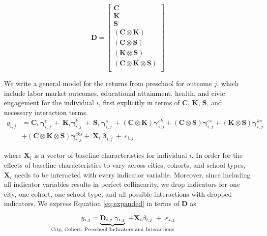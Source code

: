 \documentclass[11pt]{article}
\begin{document}
\begin{equation*}
\mathbf{D} =\begin{bmatrix} 
\mathbf{C} \\
\mathbf{K} \\
\mathbf{S} \\
(\mathbf{C} \otimes \mathbf{K}) \\
(\mathbf{C} \otimes \mathbf{S}) \\
(\mathbf{K} \otimes \mathbf{S}) \\
(\mathbf{C} \otimes \mathbf{K} \otimes \mathbf{S}) \\
\end{bmatrix}
\end{equation*}


We write a general model for the returns from preschool for outcome $j$, which include labor market outcomes, educational attainment, health, and civic engagement for the individual $i$, first explicitly in terms of $\mathbf{C}$, $\mathbf{K}$, $\mathbf{S}$, and necessary interaction terms. 
\begin{eqnarray} \label{eq:expanded}
y_{i,j} & = \mathbf{C}_{i} \ \mathbf{\gamma}_{i,j}^c\ +\ \mathbf{K}_{i} \mathbf{\gamma}^k_{i,j} \ +\ \mathbf{S}_{i}\  \mathbf{\gamma}^{s}_{i,j} \ +  (\mathbf{C} \otimes \mathbf{K})\mathbf{\gamma}_{i,j}^{ck} +   (\mathbf{C} \otimes \mathbf{S})\mathbf{\gamma}_{i,j}^{cs} +  (\mathbf{K} \otimes \mathbf{S})\mathbf{\gamma}_{i,j}^{ks} \nonumber \\ 
& + (\mathbf{C} \otimes \mathbf{K} \otimes \mathbf{S})\mathbf{\gamma}_{i,j}^{cks} +    \  \mathbf{X}_{i}\  \mathbf{\beta}_{i,j} \ + \ \varepsilon_{i,j}
\end{eqnarray}

\noindent where $\mathbf{X}_i$ is a vector of baseline characteristics for individual $i$. In order for the effects of baseline characteristics to vary across cities, cohorts, and school types, $\mathbf{X}_i$ needs to be interacted with every indicator variable. Moreover, since including all indicator variables results in perfect collinearity, we drop indicators for one city, one cohort, one school type, and all possible interactions with dropped indicators. We express Equation \ref{eq:expanded} in terms of $\mathbf{D}$ as

\begin{equation}
y_{i,j} = \underbrace{\mathbf{D}_{i,j} \ \mathbf{\gamma}{_{i,j}}}_{\mathclap{\text{City, Cohort, Preschool Indicators and Interactions}}} \ + \mathbf{X}_{i}\mathbf{\beta}_{i,j} \ + \ \varepsilon_{i,j}
\end{equation}
\end{document}
